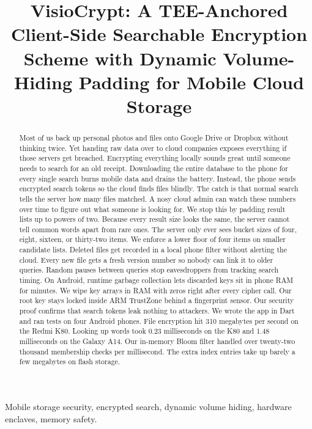 \documentclass[10pt, conference, letterpaper]{IEEEtran}
\begin{document}
\title{VisioCrypt: A TEE-Anchored Client-Side Searchable Encryption Scheme with Dynamic Volume-Hiding Padding for Mobile Cloud Storage}

\author{}

\maketitle
\thispagestyle{empty}
\pagestyle{empty}

\begin{abstract}
Most of us back up personal photos and files onto Google Drive or Dropbox without thinking twice. Yet handing raw data over to cloud companies exposes everything if those servers get breached. Encrypting everything locally sounds great until someone needs to search for an old receipt. Downloading the entire database to the phone for every single search burns mobile data and drains the battery. Instead, the phone sends encrypted search tokens so the cloud finds files blindly. The catch is that normal search tells the server how many files matched. A nosy cloud admin can watch these numbers over time to figure out what someone is looking for. We stop this by padding result lists up to powers of two. Because every result size looks the same, the server cannot tell common words apart from rare ones. The server only ever sees bucket sizes of four, eight, sixteen, or thirty-two items. We enforce a lower floor of four items on smaller candidate lists. Deleted files get recorded in a local phone filter without alerting the cloud. Every new file gets a fresh version number so nobody can link it to older queries. Random pauses between queries stop eavesdroppers from tracking search timing. On Android, runtime garbage collection lets discarded keys sit in phone RAM for minutes. We wipe key arrays in RAM with zeros right after every cipher call. Our root key stays locked inside ARM TrustZone behind a fingerprint sensor. Our security proof confirms that search tokens leak nothing to attackers. We wrote the app in Dart and ran tests on four Android phones. File encryption hit 310 megabytes per second on the Redmi K80. Looking up words took 0.23 milliseconds on the K80 and 1.48 milliseconds on the Galaxy A14. Our in-memory Bloom filter handled over twenty-two thousand membership checks per millisecond. The extra index entries take up barely a few megabytes on flash storage.
\end{abstract}

\begin{IEEEkeywords}
Mobile storage security, encrypted search, dynamic volume hiding, hardware enclaves, memory safety.
\end{IEEEkeywords}
\end{document}
